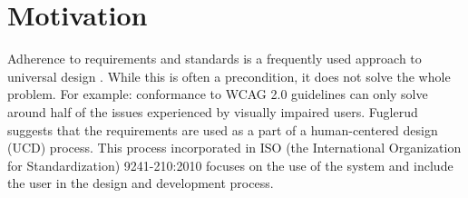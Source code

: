 


\section{Motivation}
Adherence to requirements and standards is a frequently used approach to universal design \parencite{fuglerud_link_2013}. While this is often a precondition, it does not solve the whole problem. For example: conformance to WCAG 2.0 guidelines can only solve around half of the issues experienced by visually impaired users. Fuglerud suggests that the requirements are used as a part of a human-centered design (UCD) process. This process incorporated in ISO (the International Organization for Standardization) 9241-210:2010 focuses on the use of the system and include the user in the design and development process.





